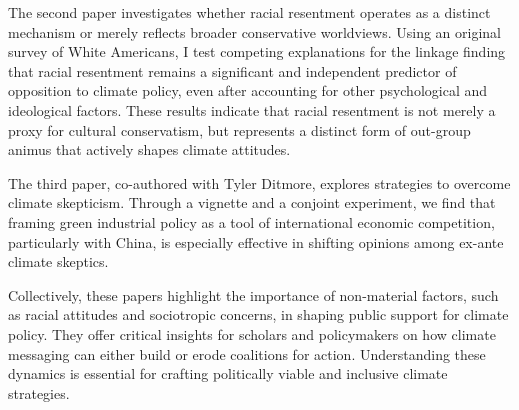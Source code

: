 The second paper investigates whether racial resentment operates as a distinct mechanism or merely reflects broader conservative worldviews. Using an original survey of White Americans, I test competing explanations for the linkage finding that racial resentment remains a significant and independent predictor of opposition to climate policy, even after accounting for other psychological and ideological factors. These results indicate that racial resentment is not merely a proxy for cultural conservatism, but represents a distinct form of out-group animus that actively shapes climate attitudes.

The third paper, co-authored with Tyler Ditmore, explores strategies to overcome climate skepticism. Through a vignette and a conjoint experiment, we find that framing green industrial policy as a tool of international economic competition, particularly with China, is especially effective in shifting opinions among ex-ante climate skeptics.


Collectively, these papers highlight the importance of non-material factors, such as racial attitudes and sociotropic concerns, in shaping public support for climate policy. They offer critical insights for scholars and policymakers on how climate messaging can either build or erode coalitions for action. Understanding these dynamics is essential for crafting politically viable and inclusive climate strategies.



\clearpage
